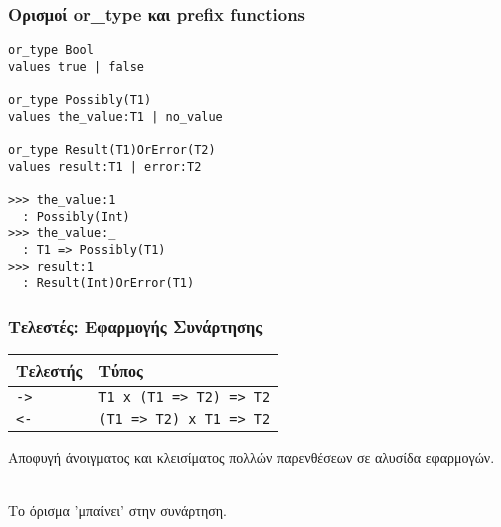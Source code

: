 \documentclass{beamer}
\def\e{\foreignlanguage{english}}
\begin{document}
\begin{frame}[fragile]

\frametitle{Ορισμοί \e{or\_type} και \e{prefix functions}}


\begin{otherlanguage}{english}
\begin{verbatim}
or_type Bool
values true | false

or_type Possibly(T1)
values the_value:T1 | no_value

or_type Result(T1)OrError(T2)
values result:T1 | error:T2

>>> the_value:1
  : Possibly(Int)
>>> the_value:_
  : T1 => Possibly(T1)
>>> result:1
  : Result(Int)OrError(T1)

\end{verbatim}
\end{otherlanguage}

\end{frame}

\begin{frame}[fragile]

\frametitle{Τελεστές: Εφαρμογής Συνάρτησης}

\begin{center}
\begin{tabular}{ |P{2cm}|P{5cm}| }
 \hline
 Τελεστής & Τύπος
 \\
 \hline
 \e{\texttt{->}} & \e{\texttt{T1 x (T1 => T2) => T2}}
 \\
 \e{\texttt{<-}} & \e{\texttt{(T1 => T2) x T1 => T2}}
 \\
 \hline
\end{tabular}
\end{center}

Αποφυγή άνοιγματος και κλεισίματος πολλών παρενθέσεων σε αλυσίδα εφαρμογών.
\\~\

Το όρισμα 'μπαίνει' στην συνάρτηση.
\end{frame}
\end{document}
